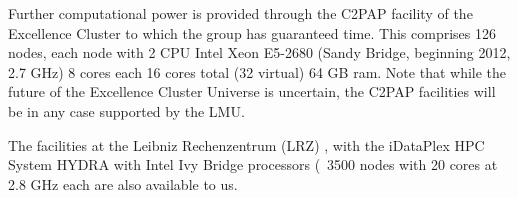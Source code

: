 \documentclass[10pt,fleqn,twoside]{article}
\begin{document}
Further computational power is provided through the C2PAP facility of the Excellence Cluster to which
the group has guaranteed time. This comprises 126 nodes, each node with 2 CPU Intel Xeon E5-2680 (Sandy
Bridge, beginning 2012, 2.7 GHz) 8 cores each 16 cores total (32
virtual) 64 GB ram. Note that while the future of the Excellence
Cluster Universe is uncertain, the C2PAP facilities will be in any
case supported by the LMU. 

The facilities at the Leibniz Rechenzentrum (LRZ) , with the iDataPlex
HPC System HYDRA with Intel Ivy Bridge processors (~3500 nodes with 20
cores at 2.8 GHz each are also available to us.





\end{document}
